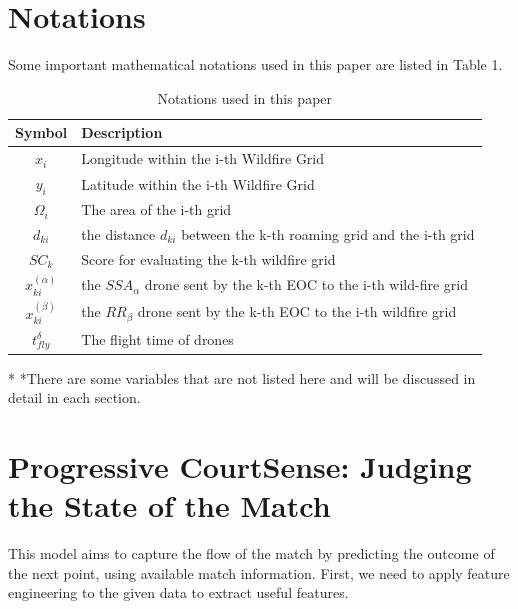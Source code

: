 \documentclass[12pt]{article}  %
\begin{document}

\section{Notations}
Some important mathematical notations used in this paper are listed in Table 1. 
\begin{table}[htbp]
\begin{center}
\caption{Notations used in this paper}
\begin{tabular}{c l}
\toprule[2pt]
\multicolumn{1}{m{3cm}}{\centering Symbol} & \multicolumn{1}{m{8cm}}{\centering Description }\\
\midrule
$x_i$ & Longitude within the i-th Wildfire Grid \\
$y_i$ & Latitude within the i-th Wildfire Grid \\
$\varOmega _i$ & The area of the i-th grid\\
$d_{ki}$ & the distance $d_{ki}$ between the k-th roaming grid and the i-th grid \\
$SC_k$ & Score for evaluating the k-th wildfire grid \\
\vspace{5pt}%
$x^{( \alpha )}_{ki}$ & the $SSA_\alpha$ drone sent by the k-th EOC to the i-th wild-fire grid\\
\vspace{3pt}
$x^{( \beta )}_{ki}$ & the $RR_\beta$ drone sent by the k-th EOC to the i-th wildfire grid\\
$t_{fly}^{\delta}$ & The flight time of drones\\
\bottomrule[2pt]
\end{tabular}\label{tb:notation}
 \begin{tablenotes}
        \footnotesize
        \item[*] *There are some variables that are not listed here and will be discussed in detail in each section. %
      \end{tablenotes}
\end{center}
\end{table}
\vspace{-1cm}%






\section{Progressive CourtSense: Judging the State of the Match}
This model aims to capture the flow of the match by predicting the outcome of the next point, using available match information. First, we need to apply feature engineering to the given data to extract useful features.
\end{document}
